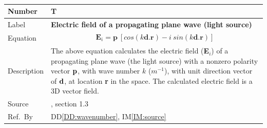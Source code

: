 \documentclass[12pt]{article}
\newcommand{\colBwidth}{0.82\textwidth} \newcommand{\colCwidth}{0.1\textwidth}
\begin{document}
	~\newline \noindent \begin{minipage}{\textwidth}
		\renewcommand*{\arraystretch}{1.5} \begin{tabular}{| p{\colAwidth} |
				p{\colBwidth}|} \hline \rowcolor[gray]{0.9} Number&
			T{theorynum}\thetheorynum \label{TM:source}\\ \hline Label&\bf
			Electric field of a propagating plane wave (light source) \\ \hline Equation&
			\begin{equation} \label{eq:planewave} \begin{gathered} \textbf{E}_{i}=
					\textbf{p}\ [ cos(k\textbf{d.r})- i \ sin(k\textbf{d.r})] \end{gathered}
			\end{equation} \\
			
			
			\hline Description & The above equation calculates the electric field
			(\textbf{E}$_i$) of a propagating plane wave (the light source) with a
			nonzero polarity vector $\bf p$, with wave number $k$ ($m^{-1}$), with unit
			direction vector of $\bf d$, at location \textbf{r} in the space. The
			calculated electric field is a 3D vector field. \\ \hline Source &
			
			\cite{monk2003finite}, section 1.3 \\ %
			\hline Ref.\ By & DD\ref{DD:wavenumber}, IM\ref{IM:source} \\ \hline
	\end{tabular} \end{minipage}\\
	
	
\end{document}
